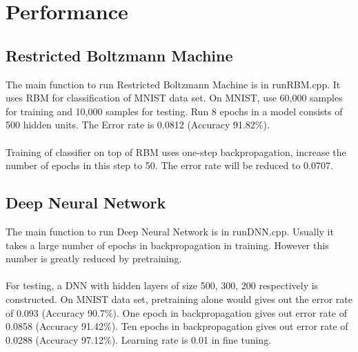 \documentclass[12pt]{article}
\begin{document}
\section{Performance}
\subsection{Restricted Boltzmann Machine}
The main function to run Restricted Boltzmann Machine is in runRBM.cpp. It uses RBM for classification of MNIST data set. On MNIST, use 60,000 samples for training and 10,000 samples for testing. Run 8 epochs in a model consists of 500 hidden units. The Error rate is 0.0812 (Accuracy 91.82$\%$).\\
\\
Training of classifier on top of RBM uses one-step backpropagation, increase the number of epochs in this step to 50. The error rate will be reduced to 0.0707.
\subsection{Deep Neural Network}
The main function to run Deep Neural Network is in runDNN.cpp. Usually it takes a large number of epochs in backpropagation in training. However this number is greatly reduced by pretraining.\\
\\
For testing, a DNN with hidden layers of size 500, 300, 200 respectively is constructed. On MNIST data set, pretraining alone would gives out the error rate of 0.093 (Accuracy 90.7$\%$). One epoch in backpropagation gives out error rate of 0.0858 (Accuracy 91.42$\%$). Ten epochs in backpropagation gives out error rate of 0.0288 (Accuracy 97.12$\%$). Learning rate is 0.01 in fine tuning.
\end{document}
